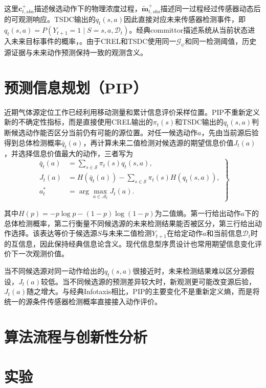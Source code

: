 \documentclass{aas}
\newcommand{\ccite}[1]{\nobreak\cite{#1}}
\begin{document}
这里$\mathbf c^+_{t,ska}$描述候选动作下的物理浓度过程，$\widetilde{\mathbf m}^{+}_{t,ska}$描述同一过程经过传感器动态后的可观测响应。TSDC输出的$q_t(s,a)$因此直接对应未来传感器检测事件，即$q_t(s,a)=P(Y_{t+1}=1\mid S=s,a,\mathcal D_t)$。经典committor描述系统从当前状态进入未来目标事件的概率\ccite{35}，。由于CREL和TSDC使用同一$\mathcal G_{\psi}$和同一检测阈值，历史源证据与未来动作预测保持一致的观测含义。

\section{预测信息规划（PIP）}

近期气体源定位工作已经利用移动测量和累计信息评价采样位置\ccite{5,6}。PIP不重新定义新的不确定性指标，而是直接使用CREL输出的$\pi_t(s)$和TSDC输出的$q_t(s,a)$判断候选动作能否区分当前仍有可能的源位置。对任一候选动作$a$，先由当前源后验得到总体检测概率$\bar q_t(a)$，再计算未来二值检测对候选源的期望信息价值$J_t(a)$，并选择信息价值最大的动作，三者写为
\begin{equation}
\left.
\begin{aligned}
\bar q_t(a)&=\sum_{s\in\mathcal S}\pi_t(s)q_t(s,a),\\
J_t(a)&=H\!\left(\bar q_t(a)\right)-\sum_{s\in\mathcal S}\pi_t(s)H\!\left(q_t(s,a)\right),\\
a_t^*&=\arg\max_{a\in\mathcal A_t}J_t(a).
\end{aligned}
\right\}
\label{eq:pip_information_action}
\end{equation}

其中$H(p)=-p\log p-(1-p)\log(1-p)$为二值熵\ccite{31}。第一行给出动作$a$下的总体检测概率，第二行衡量不同候选源的未来检测结果能否被区分，第三行给出动作选择。该表达等价于候选源$S$与未来二值检测$Y_{t+1}$在给定动作$a$和当前信息$\mathcal D_t$时的互信息，因此保持经典信息论含义\ccite{31,32}。现代信息型序贯设计也常用期望信息变化评价下一次观测价值\ccite{13,12}。

当不同候选源对同一动作给出的$q_t(s,a)$很接近时，未来检测结果难以区分源假设，$J_t(a)$较低。当不同候选源的预测差异较大时，新观测更可能改变源后验，$J_t(a)$随之增大。与经典Infotaxis\ccite{32}相比，PIP的主要变化不是重新定义熵，而是将统一的源条件传感器检测概率直接接入动作评价。

\section{算法流程与创新性分析}



\section{实验}
\end{document}
